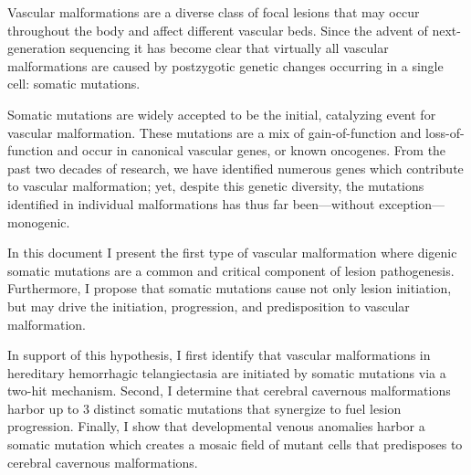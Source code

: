 \abstract

Vascular malformations are a diverse class of focal lesions that may occur throughout the body and affect different vascular beds. Since the advent of next-generation sequencing it has become clear that virtually all vascular malformations are caused by postzygotic genetic changes occurring in a single cell: somatic mutations. 

Somatic mutations are widely accepted to be the initial, catalyzing event for vascular malformation. These mutations are a mix of gain-of-function and loss-of-function and occur in canonical vascular genes, or known oncogenes. From the past two decades of research, we have identified numerous genes which contribute to vascular malformation; yet, despite this genetic diversity, the mutations identified in individual malformations has thus far been---without exception---monogenic.

In this document I present the first type of vascular malformation where digenic somatic mutations are a common and critical component of lesion pathogenesis. Furthermore, I propose that somatic mutations cause not only lesion initiation, but may drive the initiation, progression, and predisposition to vascular malformation. 

In support of this hypothesis, I first identify that vascular malformations in hereditary hemorrhagic telangiectasia are initiated by somatic mutations via a two-hit mechanism. Second, I determine that cerebral cavernous malformations harbor up to 3 distinct somatic mutations that synergize to fuel lesion progression. Finally, I show that developmental venous anomalies harbor a somatic mutation which creates a mosaic field of mutant cells that predisposes to cerebral cavernous malformations. 